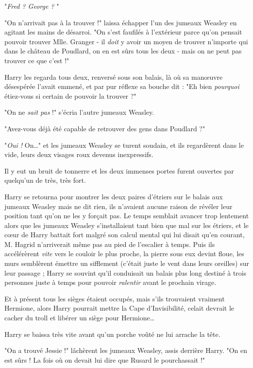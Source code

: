 "\emph{Fred ? George ?} "

"On n'arrivait pas à la trouver !" laissa échapper l'un des jumeaux Weasley en agitant les mains de désarroi. "On s'est faufilés à l'extérieur parce qu'on pensait pouvoir trouver Mlle. Granger - il \emph{doit}  y avoir un moyen de trouver n'importe qui dans le château de Poudlard, on en est sûrs tous les deux - mais on ne peut pas trouver ce que c'est !"

Harry les regarda tous deux, renversé sous son balais, là où sa manœuvre désespérée l'avait emmené, et par pur réflexe sa bouche dit : "Eh bien \emph{pourquoi}  étiez-vous si certain de pouvoir la trouver ?"

"On ne \emph{sait pas}  !" s'écria l'autre jumeaux Weasley.

"Avez-vous déjà été capable de retrouver des gens dans Poudlard ?"

"\emph{Oui !}  On…" et les jumeaux Weasley se turent soudain, et ils regardèrent dans le vide, leurs deux visages roux devenus inexpressifs.

Il y eut un bruit de tonnerre et les deux immenses portes furent ouvertes par quelqu'un de très, très fort.

Harry se retourna pour montrer les deux paires d'étriers sur le balais aux jumeaux Weasley mais ne dit rien, ils n'avaient aucune raison de révéler leur position tant qu'on ne les y forçait pas. Le temps semblait avancer trop lentement alors que les jumeaux Weasley s'installaient tant bien que mal sur les étriers, et le cœur de Harry battait fort malgré son calcul mental qui lui disait qu'en courant, M. Hagrid n'arriverait même pas au pied de l'escalier à temps. Puis ils accélérèrent \emph{vite}  vers le couloir le plus proche, la pierre sous eux devint floue, les murs semblèrent émettre un sifflement (c'était juste le vent dans leurs oreilles) sur leur passage ; Harry se souvint qu'il conduisait un balais plus long destiné à trois personnes juste à temps pour pouvoir \emph{ralentir}  avant le prochain virage.

Et à présent tous les sièges étaient occupés, mais s'ils trouvaient vraiment Hermione, alors Harry pourrait mettre la Cape d'Invisibilité, celait devrait le cacher du troll et libérer un siège pour Hermione…

Harry se baissa très vite avant qu'un porche voûté ne lui arrache la tête.

"On a trouvé Jessie !" lâchèrent les jumeaux Weasley, assis derrière Harry. "On en est sûrs ! La fois où on devait lui dire que Rusard le pourchassait !"


